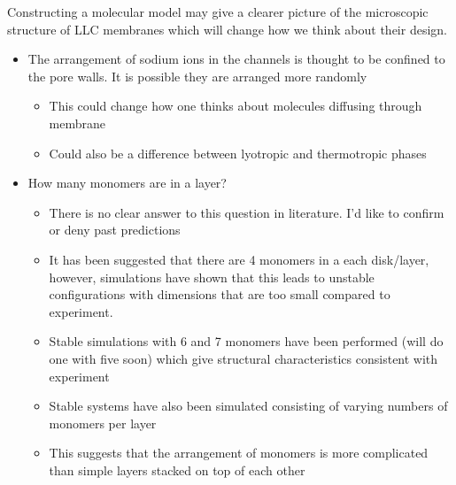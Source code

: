 \documentclass{article}
\begin{document}
	Constructing a molecular model may give a clearer picture of the microscopic structure of LLC membranes which will change how we think about their design.
	\begin{itemize}
		\item The arrangement of sodium ions in the channels is thought to be confined to the pore walls. It is possible they are arranged more randomly
		\begin{itemize}
			\item This could change how one thinks about molecules diffusing through membrane
			\item Could also be a difference between lyotropic and thermotropic phases
		\end{itemize}
		\item How many monomers are in a layer?
		\begin{itemize}
			\item There is no clear answer to this question in literature. I'd like to confirm or deny past predictions
			\item It has been suggested that there are 4 monomers in a each disk/layer, however, simulations have shown that this leads to unstable configurations with dimensions that are too small compared to experiment.
			\item Stable simulations with 6 and 7 monomers have been performed (will do one with five soon) which give structural characteristics consistent with experiment
			\item Stable systems have also been simulated consisting of varying numbers of monomers per layer
			\item This suggests that the arrangement of monomers is more complicated than simple layers stacked on top of each other
		\end{itemize}
	\end{itemize}
	
\end{document}
